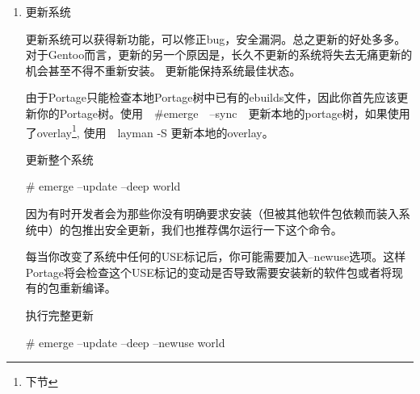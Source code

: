 \begin{enumerate}
如果你试图从系统中移除一个这样的软件包的集合体，只是单纯地使用emerge --unmerge命令并不能完成你的要求，原因在于这些包的依赖关系仍然保留在系统中。 

\begin{example}{移除孤立依赖的软件包}

\begin{code}
\# emerge --update --deep --newuse world\\
\# emerge --depclean\\

\# revdep-rebuild\footnote{revdep-rebuild工具由gentoolkit包提供；使用前别忘了首先emerge它哦。}\\
 或者如果用的　portage-2.2 以上的版本则用\\
\#　emerge @preserved-rebuild \\
\end{code}

\end{example}




\item 更新系统

更新系统可以获得新功能，可以修正bug，安全漏洞。总之更新的好处多多。对于Gentoo而言，更新的另一个原因是，长久不更新的系统将失去无痛更新的机会甚至不得不重新安装。
更新能保持系统最佳状态。

由于Portage只能检查本地Portage树中已有的ebuilds文件，因此你首先应该更新你的Portage树。使用　\#emerge　--sync　更新本地的portage树，如果使用了overlay\footnote{下节}, 使用　layman -S 更新本地的overlay。


\begin{example}{更新整个系统}
\begin{code}
\# emerge --update --deep world
\end{code}
\end{example}

因为有时开发者会为那些你没有明确要求安装（但被其他软件包依赖而装入系统中）的包推出安全更新，我们也推荐偶尔运行一下这个命令。

每当你改变了系统中任何的USE标记后，你可能需要加入--newuse选项。这样Portage将会检查这个USE标记的变动是否导致需要安装新的软件包或者将现有的包重新编译。

\begin{example}{执行完整更新}
\begin{code}
\# emerge --update --deep --newuse world
\end{code}
\end{example}

\end{enumerate}

